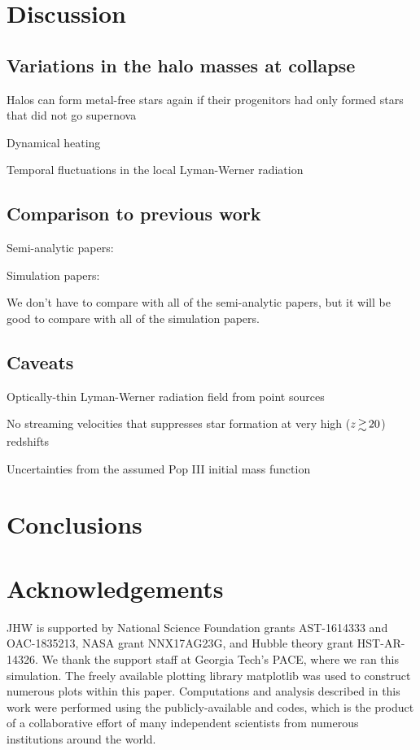 \documentclass[a4paper,fleqn,usenatbib]{mnras}
\begin{document}
\section{Discussion}

\subsection{Variations in the halo masses at collapse}

\li Halos can form metal-free stars again if their progenitors had
only formed stars that did not go supernova

\li Dynamical heating \citep{Yoshida03}

\li Temporal fluctuations in the local Lyman-Werner radiation

\subsection{Comparison to previous work}

\li Semi-analytic papers: \citep{Tegmark97, Trenti09, Visbal18,
  Mebane18, Griffen18}

\li Simulation papers: \citep{Machacek01, Yoshida03, Wise07_UVB,
  OShea08, Muratov13}

\li We don't have to compare with all of the semi-analytic papers, but
it will be good to compare with all of the simulation papers.

\subsection{Caveats}

\li Optically-thin Lyman-Werner radiation field from point sources \citep{Schauer17}

\li No streaming velocities that suppresses star formation at very
high ($z \ga 20$) redshifts \citep{Tselia11, Greif11_Delay, Naoz12, OLeary12}

\li Uncertainties from the assumed Pop III initial mass function 

\section{Conclusions}


\section*{Acknowledgements}

JHW is supported by National Science Foundation grants AST-1614333 and
OAC-1835213, NASA grant NNX17AG23G, and Hubble theory grant
HST-AR-14326.  We thank the support staff at Georgia Tech's PACE,
where we ran this simulation.  The freely available plotting library
{\sc matplotlib} \citep{matplotlib} was used to construct numerous
plots within this paper. Computations and analysis described in this
work were performed using the publicly-available \enzo{} and \yt{}
codes, which is the product of a collaborative effort of many
independent scientists from numerous institutions around the world.
\end{document}

